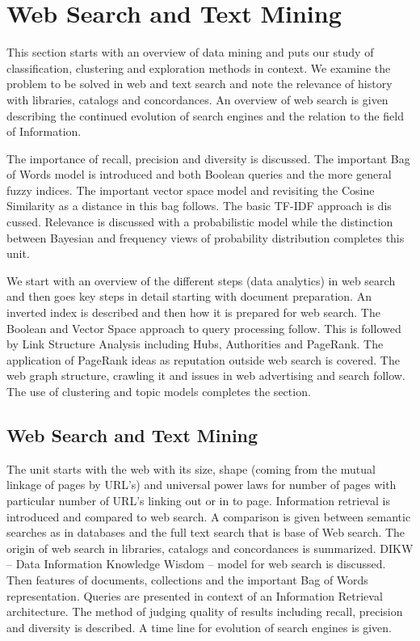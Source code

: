 \chapter{Web Search and Text Mining}\label{web-search-and-text-mining}

\FILENAME

This section starts with an overview of data mining and puts our study
of classification, clustering and exploration methods in context. We
examine the problem to be solved in web and text search and note the
relevance of history with libraries, catalogs and concordances. An
overview of web search is given describing the continued evolution of
search engines and the relation to the field of Information.

The importance of recall, precision and diversity is discussed. The
important Bag of Words model is introduced and both Boolean queries and
the more general fuzzy indices. The important vector space model and
revisiting the Cosine Similarity as a distance in this bag follows. The
basic TF-IDF approach is dis cussed. Relevance is discussed with a
probabilistic model while the distinction between Bayesian and frequency
views of probability distribution completes this unit.

We start with an overview of the different steps (data analytics) in web
search and then goes key steps in detail starting with document
preparation. An inverted index is described and then how it is prepared
for web search. The Boolean and Vector Space approach to query
processing follow. This is followed by Link Structure Analysis including
Hubs, Authorities and PageRank. The application of PageRank ideas as
reputation outside web search is covered. The web graph structure,
crawling it and issues in web advertising and search follow. The use of
clustering and topic models completes the section.

\section{Web Search and Text Mining}\label{web-search-and-text-mining-i}

The unit starts with the web with its size, shape (coming from the
mutual linkage of pages by URL's) and universal power laws for number of
pages with particular number of URL's linking out or in to page.
Information retrieval is introduced and compared to web search. A
comparison is given between semantic searches as in databases and the
full text search that is base of Web search. The origin of web search in
libraries, catalogs and concordances is summarized. DIKW -- Data
Information Knowledge Wisdom -- model for web search is discussed. Then
features of documents, collections and the important Bag of Words
representation. Queries are presented in context of an Information
Retrieval architecture. The method of judging quality of results
including recall, precision and diversity is described. A time line for
evolution of search engines is given.

